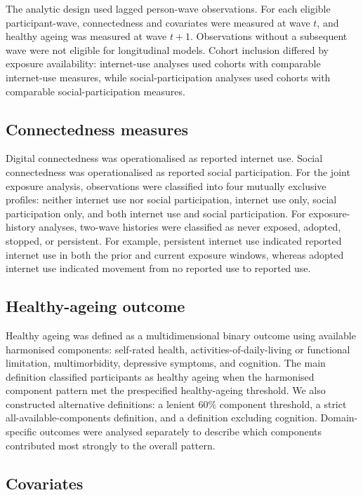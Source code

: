 \documentclass[pdflatex,sn-nature]{sn-jnl}
\begin{document}
The analytic design used lagged person-wave observations. For each eligible participant-wave, connectedness and covariates were measured at wave $t$, and healthy ageing was measured at wave $t+1$. Observations without a subsequent wave were not eligible for longitudinal models. Cohort inclusion differed by exposure availability: internet-use analyses used cohorts with comparable internet-use measures, while social-participation analyses used cohorts with comparable social-participation measures.

\subsection{Connectedness measures}

Digital connectedness was operationalised as reported internet use. Social connectedness was operationalised as reported social participation. For the joint exposure analysis, observations were classified into four mutually exclusive profiles: neither internet use nor social participation, internet use only, social participation only, and both internet use and social participation. For exposure-history analyses, two-wave histories were classified as never exposed, adopted, stopped, or persistent. For example, persistent internet use indicated reported internet use in both the prior and current exposure windows, whereas adopted internet use indicated movement from no reported use to reported use.

\subsection{Healthy-ageing outcome}

Healthy ageing was defined as a multidimensional binary outcome using available harmonised components: self-rated health, activities-of-daily-living or functional limitation, multimorbidity, depressive symptoms, and cognition. The main definition classified participants as healthy ageing when the harmonised component pattern met the prespecified healthy-ageing threshold. We also constructed alternative definitions: a lenient 60\% component threshold, a strict all-available-components definition, and a definition excluding cognition. Domain-specific outcomes were analysed separately to describe which components contributed most strongly to the overall pattern.

\subsection{Covariates}
\end{document}
